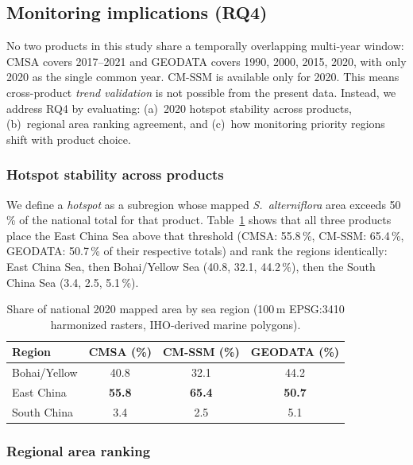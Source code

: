 \documentclass[11pt]{article}
\begin{document}
\subsection{Monitoring implications (RQ4)}
\label{sec:rq4}

No two products in this study share a temporally overlapping multi-year window:
CMSA covers 2017--2021 and GEODATA covers 1990, 2000, 2015, 2020, with only 2020
as the single common year. CM-SSM is available only for 2020. This means
cross-product \emph{trend validation} is not possible from the present data.
Instead, we address RQ4 by evaluating: (a)~2020 hotspot stability across
products, (b)~regional area ranking agreement, and (c)~how monitoring priority
regions shift with product choice.

\subsubsection{Hotspot stability across products}

We define a \textit{hotspot} as a subregion whose mapped \textit{S.~alterniflora}
area exceeds 50\,\% of the national total for that product.
Table~\ref{tab:hotspots} shows that all three products place the East China
Sea above that threshold (CMSA: 55.8\,\%, CM-SSM: 65.4\,\%, GEODATA:
50.7\,\% of their respective totals) and rank the regions identically:
East China Sea, then Bohai/Yellow Sea (40.8, 32.1, 44.2\,\%), then the
South China Sea (3.4, 2.5, 5.1\,\%).

\begin{table}[htpb]
\centering
\caption{\label{tab:hotspots}Share of national 2020 mapped area by sea region
  (100\,m EPSG:3410 harmonized rasters, IHO-derived marine polygons).}
\begin{tabular}{l c c c}
\toprule
Region & CMSA (\%) & CM-SSM (\%) & GEODATA (\%) \\
\midrule
Bohai/Yellow & 40.8 & 32.1 & 44.2 \\
East China   & \textbf{55.8} & \textbf{65.4} & \textbf{50.7} \\
South China  & 3.4 & 2.5 & 5.1 \\
\bottomrule
\end{tabular}
\end{table}

\subsubsection{Regional area ranking}
\end{document}
